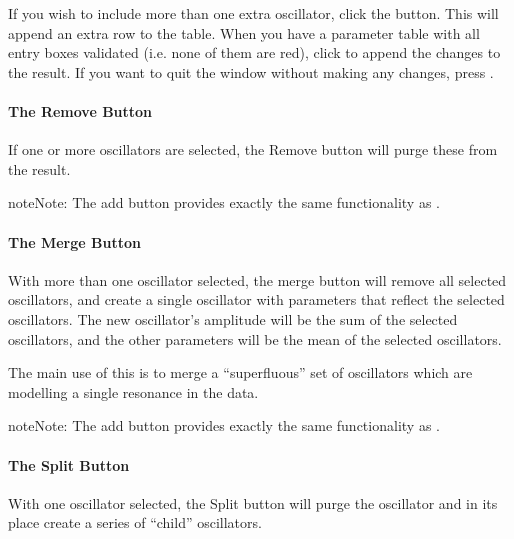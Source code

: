 \documentclass[letterpaper,10pt,english]{sphinxmanual}
\begin{document}
\sphinxAtStartPar
If you wish to include more than one extra oscillator, click the  button.
This will append an extra row to the table. When you have a parameter table
with all entry boxes validated (i.e. none of them are red), click 
to append the changes to the result. If you want to quit the window without
making any changes, press .


\paragraph{The Remove Button}
\label{\detokenize{gui/usage/result:the-remove-button}}
\sphinxAtStartPar
If one or more oscillators are selected, the Remove button will purge these
from the result.

\begin{sphinxadmonition}{note}{Note:}
\sphinxAtStartPar
The add button provides exactly the same functionality as
{\hyperref[\detokenize{references/core:nmrespy.core.Estimator.remove_oscillators}]{}}.
\end{sphinxadmonition}


\paragraph{The Merge Button}
\label{\detokenize{gui/usage/result:the-merge-button}}
\sphinxAtStartPar
With more than one oscillator selected, the merge button will remove all
selected oscillators, and create a single oscillator with parameters that
reflect the selected oscillators. The new oscillator’s amplitude will be
the sum of the selected oscillators, and the other parameters will be the
mean of the selected oscillators.

\sphinxAtStartPar
The main use of this is to merge a “superfluous” set of oscillators which
are modelling a single resonance in the data.

\begin{sphinxadmonition}{note}{Note:}
\sphinxAtStartPar
The add button provides exactly the same functionality as
{\hyperref[\detokenize{references/core:nmrespy.core.Estimator.merge_oscillators}]{}}.
\end{sphinxadmonition}


\paragraph{The Split Button}
\label{\detokenize{gui/usage/result:the-split-button}}
\sphinxAtStartPar
With one oscillator selected, the Split button will purge the oscillator
and in its place create a series of “child” oscillators.
\end{document}

